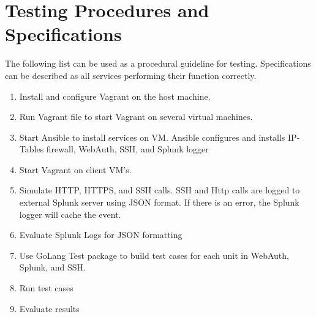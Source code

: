 \section{Testing Procedures and Specifications}
The following list can be used as a procedural guideline for testing. Specifications can be described as all services performing their function correctly.
\begin{enumerate}
\item Install and configure Vagrant on the host machine. 
\item Run Vagrant file to start Vagrant on several virtual machines.
\item Start Ansible to install services on VM. Ansible configures and installs IP-Tables firewall, WebAuth, SSH, and Splunk logger
\item Start Vagrant on client VM's.
\item Simulate HTTP, HTTPS, and SSH calls. SSH and Http calls are logged to external Splunk server using JSON format. If there is an error, the Splunk logger will cache the event.
\item Evaluate Splunk Logs for JSON formatting
\item Use GoLang Test package to build test cases for each unit in WebAuth, Splunk, and SSH.
\item Run test cases
\item Evaluate results
\end{enumerate}
